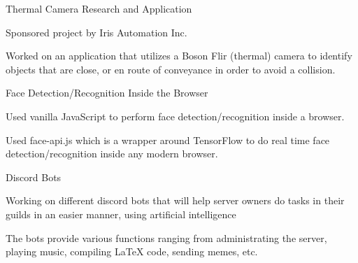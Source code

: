 
\begin{cventries}
   \cventry
    {} %
    {Thermal Camera Research and Application} %
    {} %
    {} %
    {
      \begin{cvitems} %
      	\item {Sponsored project by Iris Automation Inc.}
		\item {Worked on an application that utilizes a Boson Flir (thermal) camera to identify objects that are close, or en route of conveyance in order to avoid a collision.}
      \end{cvitems}
    }
  \cventry
    {} %
    {Face Detection/Recognition Inside the Browser} %
    {} %
    {} %
    {
      \begin{cvitems} %
        \item {Used vanilla JavaScript to perform face detection/recognition inside a browser.}
		\item {Used face-api.js which is a wrapper around TensorFlow to do real time face detection/recognition inside any modern browser.}
      \end{cvitems}
    }

  \cventry
    {} %
    {Discord Bots} %
    {} %
    {} %
    {
      \begin{cvitems} %
      	\item {Working on different discord bots that will help server owners do tasks in their guilds in an easier manner, using artificial intelligence}
		\item {The bots provide various functions ranging from administrating the server, playing music, compiling LaTeX code, sending memes, etc. }
      \end{cvitems}
    }
\end{cventries}